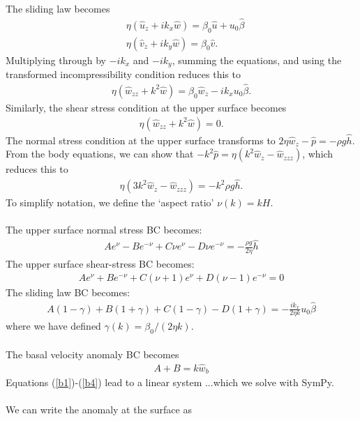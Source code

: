 \documentclass[paper=a4, fontsize=11pt]{article}
\begin{document}
The sliding law becomes
\begin{align}
&\eta( \hat{u}_z + ik_x \hat{w}) = \beta_0\hat{u} + u_0\hat{\beta} \\
&\eta( \hat{v}_z + ik_y \hat{w}) = \beta_0\hat{v}.
\end{align}
Multiplying through by $-ik_x$ and $-ik_y$, summing the equations, and using the transformed incompressibility
condition reduces this to
\begin{align}
\eta(\hat{w}_{zz} + k^2 \hat{w}) = \beta_0 \hat{w}_z - ik_x   u_0\hat{\beta}.
\end{align}
Similarly, the shear stress condition at the upper surface becomes
\begin{align}
\eta(\hat{w}_{zz} + k^2 \hat{w}) =  0.
\end{align}
The normal stress condition at the upper surface transforms to
$
2\eta \hat{w}_{z} - \hat{p} = -\rho g \hat{h}.
$
From the body equations, we can show that
$-k^2 \hat{p} = \eta(k^2\hat{w}_z - \hat{w}_{zzz}) $, which reduces this to
\begin{align}
\eta (3k^2 \hat{w}_{z}-\hat{w}_{zzz})  = -k^2 \rho g \hat{h}.
\end{align}
To simplify notation, we define the `aspect ratio' $\nu(k) = kH$.\\ \\
The upper surface normal stress BC becomes:
\begin{align}
{A} e^{\nu} - {B} e^{-\nu} + {C}\nu e^{\nu} - {D}\nu e^{-\nu}
=- \frac{\rho g }{2\eta }\hat{h} \label{b1}
\end{align}
The upper surface shear-stress BC becomes:
\begin{align}
A e^{\nu} + B e^{-\nu} + C(\nu+1) e^{\nu} +D(\nu-1) e^{-\nu} =  0
\end{align}
The sliding law BC becomes:
\begin{align}
{A(1-\gamma)} + {B(1+\gamma)} + {C(1-\gamma)}  - {D(1+\gamma)} = -\frac{ ik_x }{2\eta k}u_0\hat{\beta}
\end{align}
where we have defined $\gamma(k) = \beta_0/(2\eta k)$. \\
\\ The basal velocity anomaly BC becomes
\begin{align}
{A} + {B}  = k\hat{w}_b \label{b4}
\end{align}
Equations (\ref{b1})-(\ref{b4}) lead to a linear system
...which we solve with SymPy.\\ \\
We can write the anomaly at the surface as
\end{document}
